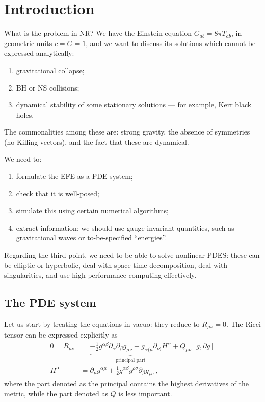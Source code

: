 \documentclass[main.tex]{subfiles}
\begin{document}
\section{Introduction}

What is the problem in NR?
We have the Einstein equation \(G_{ab} = 8 \pi T_{ab}\), in geometric units \(c = G = 1\), and we want to discuss its solutions which cannot be expressed analytically:
\begin{enumerate}
    \item gravitational collapse;
    \item BH or NS collisions;
    \item dynamical stability of some stationary solutions --- for example, Kerr black holes. 
\end{enumerate}

The commonalities among these are: strong gravity, the absence of symmetries (no Killing vectors), and the fact that these are dynamical. 

We need to: 
\begin{enumerate}
    \item  formulate the EFE as a PDE system;
    \item check that it is well-posed;
    \item simulate this using certain numerical algorithms;
    \item extract information: we should use gauge-invariant quantities, such as gravitational waves or to-be-specified ``energies''. 
\end{enumerate}

Regarding the third point, we need to be able to solve nonlinear PDES: these can be elliptic or hyperbolic, deal with space-time decomposition, deal with singularities, and use high-performance computing effectively. 

\subsection{The PDE system}

Let us start by treating the equations in vacuo: they reduce to \(R_{\mu \nu } = 0 \).  The Ricci tensor can be expressed explicitly as 
%
\begin{align}
0 = R_{\mu \nu } &= \underbrace{- \frac{1}{2} g^{\alpha \beta } \partial_{\alpha } \partial_{\beta } g_{\mu \nu } - g_{\alpha (\mu } \partial_{\nu )} H^{\alpha }}_{\text{principal part}} + Q_{\mu \nu } [g, \partial g]  \\
H^{\alpha } &= \partial_{\mu } g^{\alpha \mu } + \frac{1}{2} g^{\alpha \beta } g^{\rho \sigma } \partial_{\beta } g_{\rho \sigma }
\,,
\end{align}
%
where the part denoted as the principal contains the highest derivatives of the metric, while the part denoted as \(Q\) is less important. 
\end{document}
